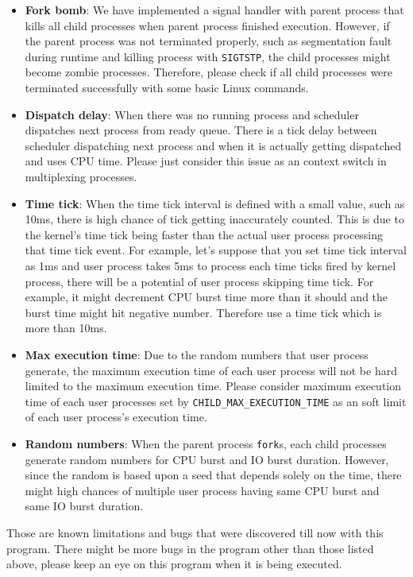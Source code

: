 \documentclass{homework}
\begin{document}
\begin{itemize}
    \item \textbf{Fork bomb}: We have implemented a signal handler with parent process that kills all child processes when parent process finished execution. However, if the parent process was not terminated properly, such as segmentation fault during runtime and killing process with \texttt{SIGTSTP}, the child processes might become zombie processes. Therefore, please check if all child processes were terminated successfully with some basic Linux commands.
    \item \textbf{Dispatch delay}: When there was no running process and scheduler dispatches next process from ready queue. There is a tick delay between scheduler dispatching next process and when it is actually getting dispatched and uses CPU time. Please just consider this issue as an context switch in multiplexing processes.
    \item \textbf{Time tick}: When the time tick interval is defined with a small value, such as 10ms, there is high chance of tick getting inaccurately counted. This is due to the kernel's time tick being faster than the actual user process processing that time tick event. For example, let's suppose that you set time tick interval as 1ms and user process takes 5ms to process each time ticks fired by kernel process, there will be a potential of user process skipping time tick. For example, it might decrement CPU burst time more than it should and the burst time might hit negative number. Therefore use a time tick which is more than 10ms.
    \item \textbf{Max execution time}: Due to the random numbers that user process generate, the maximum execution time of each user process will not be hard limited to the maximum execution time. Please consider maximum execution time of each user processes set by \texttt{CHILD_MAX_EXECUTION_TIME} as an soft limit of each user process's execution time.
    \item \textbf{Random numbers}: When the parent process \texttt{fork}s, each child processes generate random numbers for CPU burst and IO burst duration. However, since the random is based upon a seed that depends solely on the time, there might high chances of multiple user process having same CPU burst and same IO burst duration. 
\end{itemize}

Those are known limitations and bugs that were discovered till now with this program. There might be more bugs in the program other than those listed above, please keep an eye on this program when it is being executed. 
\pagebreak
\end{document}
